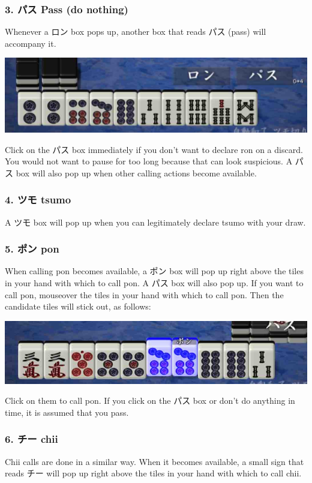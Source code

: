 \subsubsection{3. パス Pass (do nothing)}
Whenever a ロン box pops up, another box that reads パス (pass) will accompany it.
\begin{center}
\includegraphics[width=.7\textwidth,clip]{figs/ron.jpg}
\end{center}
Click on the パス box immediately if you don't want to declare {\jap ron} on a discard. You would not want to pause for too long because that can look suspicious. A パス box will also pop up when other calling actions become available.

\subsubsection{4. ツモ {\jap tsumo} \textipa{[ts\'umo]}}
A ツモ box will pop up when you can legitimately declare {\jap tsumo} with your draw.

\subsubsection{5. ポン {\jap pon} \textipa{[p\'\textopeno\ng]}}
When calling {\jap pon} becomes available, a ポン box will pop up right above the tiles in your hand with which to call {\jap pon}. A パス box will also pop up. If you want to call {\jap pon}, mouseover the tiles in your hand with which to call {\jap pon}. Then the candidate tiles will stick out, as follows:
\begin{center}
\includegraphics[width=.7\textwidth,clip]{figs/pung.jpg}
\end{center}
Click on them to call {\jap pon}. If you click on the パス box or don't do anything in time, it is assumed that you pass.

\subsubsection{6. チー {\jap chii} }
{\jap Chii} calls are done in a similar way. When it becomes available, a small sign that reads チー will pop up right above the tiles in your hand with which to call {\jap chii}.

